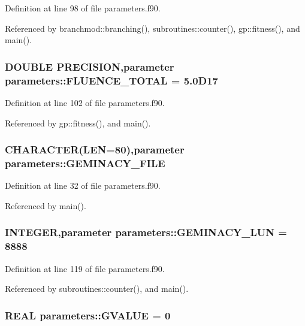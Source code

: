 Definition at line 98 of file parameters.f90.

Referenced by branchmod::branching(), subroutines::counter(), gp::fitness(), and main().\hypertarget{namespaceparameters_ac25828691892f40b7a0028332d62de30}{
\subsubsection[{FLUENCE\_\-TOTAL}]{\setlength{\rightskip}{0pt plus 5cm}DOUBLE PRECISION,parameter {\bf parameters::FLUENCE\_\-TOTAL} = 5.0D17}}
\label{namespaceparameters_ac25828691892f40b7a0028332d62de30}


Definition at line 102 of file parameters.f90.

Referenced by gp::fitness(), and main().\hypertarget{namespaceparameters_a045269697aa491915bf603f55e12b63a}{
\subsubsection[{GEMINACY\_\-FILE}]{\setlength{\rightskip}{0pt plus 5cm}CHARACTER(LEN=80),parameter {\bf parameters::GEMINACY\_\-FILE}}}
\label{namespaceparameters_a045269697aa491915bf603f55e12b63a}


Definition at line 32 of file parameters.f90.

Referenced by main().\hypertarget{namespaceparameters_aee37c9403c4b1f81a4b8331509b6a21d}{
\subsubsection[{GEMINACY\_\-LUN}]{\setlength{\rightskip}{0pt plus 5cm}INTEGER,parameter {\bf parameters::GEMINACY\_\-LUN} = 8888}}
\label{namespaceparameters_aee37c9403c4b1f81a4b8331509b6a21d}


Definition at line 119 of file parameters.f90.

Referenced by subroutines::counter(), and main().\hypertarget{namespaceparameters_a3c39b69e0083dc018e4546bd5a02b301}{
\subsubsection[{GVALUE}]{\setlength{\rightskip}{0pt plus 5cm}REAL {\bf parameters::GVALUE} = 0}}
\label{namespaceparameters_a3c39b69e0083dc018e4546bd5a02b301}


